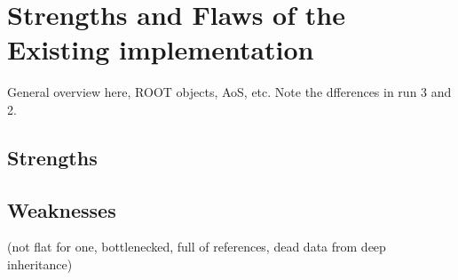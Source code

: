 \documentclass{report}
\begin{document}
\chapter{Strengths and Flaws of the Existing implementation}
General overview here, ROOT objects, AoS, etc. Note the dfferences in run 3 and 2.
\section{Strengths}
\section{Weaknesses}
(not flat for one, bottlenecked, full of references, dead data from deep inheritance)
\end{document}
